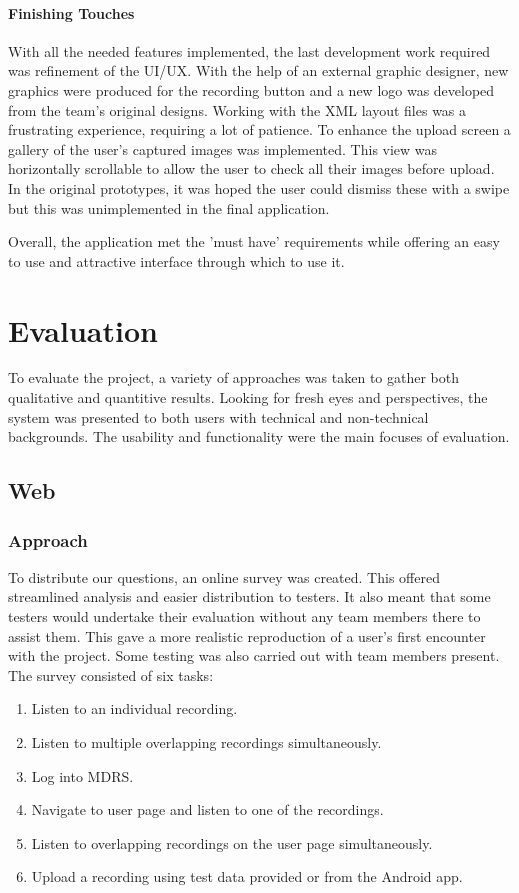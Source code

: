 \documentclass{l3proj}
\begin{document}
\subsubsection{Finishing Touches}
With all the needed features implemented, the last development work required was refinement of the UI/UX. With the help of an external graphic designer, new graphics were produced for the recording button and a new logo was developed from the team's original designs. Working with the XML layout files was a frustrating experience, requiring a lot of patience. To enhance the upload screen a gallery of the user's captured images was implemented. This view was horizontally scrollable to allow the user to check all their images before upload. In the original prototypes, it was hoped the user could dismiss these with a swipe but this was unimplemented in the final application.

Overall, the application met the 'must have' requirements while offering an easy to use and attractive interface through which to use it.

\chapter{Evaluation}

To evaluate the project, a variety of approaches was taken to gather both qualitative and quantitive results. Looking for fresh eyes and perspectives, the system was presented to both users with technical and non-technical backgrounds. The usability and functionality were the main focuses of evaluation.

\section{Web}
\subsection{Approach}		To distribute our questions, an online survey was created. This offered streamlined analysis and easier distribution to testers. It also meant that some testers would undertake their evaluation without any team members there to assist them. This gave a more realistic reproduction of a user's first encounter with the project. Some testing was also carried out with team members present. The survey consisted of six tasks:

\begin{enumerate}
\item{Listen to an individual recording.}
\item{Listen to multiple overlapping recordings simultaneously.}
\item{Log into MDRS.}
\item{Navigate to user page and listen to one of the recordings.}
\item{Listen to overlapping recordings on the user page simultaneously.}
\item{Upload a recording using test data provided or from the Android app.}
\end{enumerate}
\end{document}
